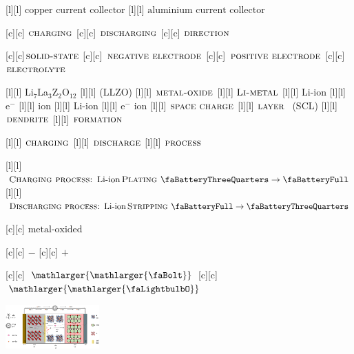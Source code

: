 [l][l]  {\footnotesize $\text{copper current collector}$}
[l][l] {\footnotesize $\text{aluminium current collector}$}

[c][c]  {\scriptsize $\textsc{charging}$}
[c][c] {\scriptsize $\textsc{discharging}$}
[c][c] {\scriptsize $\textsc{direction}$}

[c][c]{\scriptsize $\textsc{solid-state}$}
[c][c] {\scriptsize $\textsc{negative electrode}$}
[c][c] {\scriptsize $\textsc{positive electrode}$}
[c][c] {\scriptsize $\textsc{electrolyte}$}

[l][l]  {\tiny Li$_{7}$La$_{3}$Z$_{2}$O$_{12}$}
[l][l] {\tiny (LLZO)}
[l][l] {\tiny $\textsc{metal-oxide}$}
[l][l]  {\tiny $\textsc{Li-metal}$}
[l][l] {\tiny Li-ion}
[l][l] {\tiny $\text{e}^{-}$}
[l][l] {\tiny $\text{ion}$}
[l][l] {\tiny Li-ion}
[l][l] {\tiny $\text{e}^{-}$ ion}
[l][l]  {\tiny $\textsc{space charge}$}
[l][l]  {\tiny $\textsc{layer }$ (SCL)}
[l][l]   {\tiny $\textsc{dendrite}$}
[l][l]  {\tiny $\textsc{formation}$}

[l][l]  {\tiny $\textsc{charging}$}
[l][l] {\tiny $\textsc{discharge}$}
[l][l]  {\tiny $\textsc{process}$}

[l][l] {$\textsc{Charging process: }\text{Li-ion}\,\textsc{Plating }
		\text{\faBatteryThreeQuarters} \rightarrow \text{\faBatteryFull}$}
[l][l] {\scriptsize $\textsc{Discharging process: }\text{Li-ion}\,\textsc{Stripping }
		\text{\faBatteryFull} \rightarrow \text{\faBatteryThreeQuarters}$}

[c][c] {$\text{metal-oxided}$}

[c][c] {\small $-$}
[c][c] {\small $+$}

[c][c] {$\mathlarger{\mathlarger{\text{\faBolt}}}$}
[c][c] {$\mathlarger{\mathlarger{\text{\faLightbulbO}}}$}

\includegraphics[width=0.27\textwidth]{batt3dswell_scaled_2ways_discharging_color.eps}